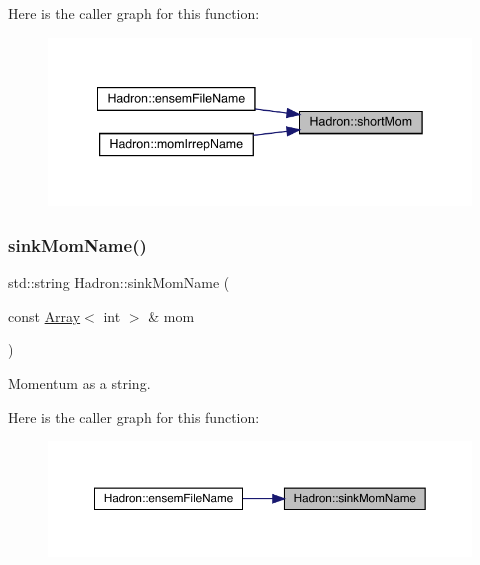Here is the caller graph for this function\+:
\nopagebreak
\begin{figure}[H]
\begin{center}
\leavevmode
\includegraphics[width=342pt]{d1/daf/namespaceHadron_aaaec62d26ea28ccc4d611b4797a1d667_icgraph}
\end{center}
\end{figure}
\mbox{\label{namespaceHadron_aaa6ace3b1a5c63de278a8bcb9fa80c49}} 
\subsubsection{\texorpdfstring{sinkMomName()}{sinkMomName()}}
{\footnotesize\ttfamily std\+::string Hadron\+::sink\+Mom\+Name (\begin{DoxyParamCaption}\item[{const \mbox{\hyperlink{classXMLArray_1_1Array}{Array}}$<$ int $>$ \&}]{mom }\end{DoxyParamCaption})}



Momentum as a string. 

Here is the caller graph for this function\+:
\nopagebreak
\begin{figure}[H]
\begin{center}
\leavevmode
\includegraphics[width=350pt]{d1/daf/namespaceHadron_aaa6ace3b1a5c63de278a8bcb9fa80c49_icgraph}
\end{center}
\end{figure}
\mbox{\label{namespaceHadron_addad39b9d17263485541d757bb712420}} 
